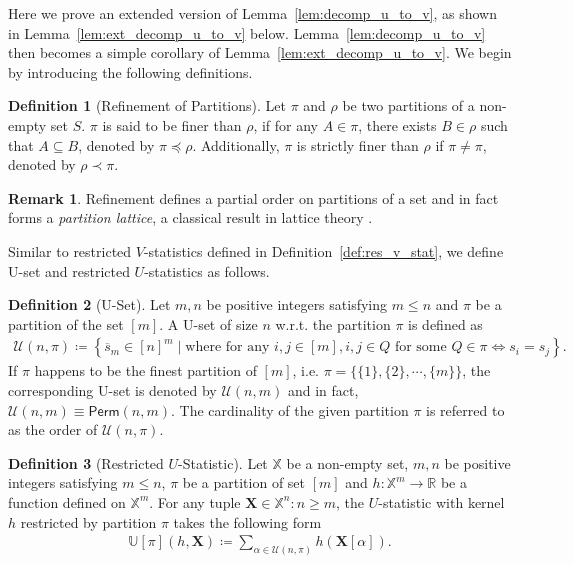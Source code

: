 \documentclass[sn-mathphys, natbib=false]{sn-jnl}
\theoremstyle{plain}
\theoremstyle{definition}
\newtheorem{definition}{Definition}
\newtheorem{remark}{Remark}
\newcommand{\sPi}{\pi}
\newcommand{\uset}{\calU}
\newcommand{\usetnm}[2]{\uset\left(#1,#2\right)}
\newcommand{\ustat}{\mathbb{U}}
\newcommand{\perm}[1]{\mathsf{Perm}(#1)}
\newcommand{\pleq}{\preceq}
\newcommand{\pless}{\prec}
\newcommand{\bbR}{{\mathbb{R}}}
\def\bbX{\mathbb{X}}
\def\calU{\mathcal{U}}
\begin{document}
\begin{bibunit}[agsm]
Here we prove an extended version of Lemma~\ref{lem:decomp_u_to_v}, as shown in Lemma~\ref{lem:ext_decomp_u_to_v} below. Lemma~\ref{lem:decomp_u_to_v} then becomes a simple corollary of Lemma~\ref{lem:ext_decomp_u_to_v}. We begin by introducing the following definitions.

\begin{definition}[Refinement of Partitions]\label{def:refinement_of_partition}
Let $\sPi$ and $\rho$ be two partitions of a non-empty set $S$. $\sPi$ is said to be finer than $\rho$, if for any $A \in \sPi$, there exists $B \in \rho$ such that $A \subseteq B$, denoted by $\sPi \pleq \rho$. Additionally, $\sPi$ is strictly finer than $\rho$ if $\sPi \neq \sPi$, denoted by $\rho \pless \sPi$. 
\end{definition}

\begin{remark}
Refinement defines a partial order on partitions of a set and in fact forms a \emph{partition lattice}, a classical result in lattice theory \citep{birkhoff1940lattice}. 
\end{remark}

Similar to restricted $V$-statistics defined in Definition~\ref{def:res_v_stat}, we define U-set and restricted $U$-statistics as follows. 

\begin{definition}[U-Set]\label{def:u_set}
Let $m,n$ be positive integers satisfying $m \leq n$ and $\sPi$ be a partition of the set $[m]$. A U-set of size $n$ w.r.t. the partition $\sPi$ is defined as
    \begin{align*}
        \usetnm{n}{\sPi} \coloneqq \left\{ \overline{s}_m \in [n]^m \mid \text{where for any $i, j \in [m]$}, i, j \in Q \text{ for some $Q \in \sPi$} \iff   s_i = s_j \right\}.
    \end{align*}
    If $\sPi$ happens to be the finest partition of $[m]$, i.e. $\sPi = \{\{1\}, \{2\}, \cdots, \{m\}\}$, the corresponding U-set is denoted by $\uset(n,m)$ and in fact, $\uset(n,m) \equiv \perm{n,m}$. The cardinality of the given partition $\sPi$ is referred to as the order of $\usetnm{n}{\sPi}$.
\end{definition}

\begin{definition}[Restricted $U$-Statistic]\label{def:res_u_stats}
    Let $\bbX$ be a non-empty set, $m, n$ be positive integers satisfying $m \leq n$, $\sPi$ be a partition of set $[m]$ and $h: \bbX^{m} \rightarrow \bbR$ be a function defined on $\bbX^m$. For any tuple $\bm{X} \in \bbX^n: n \geq m$, the $U$-statistic with kernel $h$ restricted by partition $\sPi$ takes the following form 
    \begin{align*}
        \ustat[\pi](h, \bm{X}) \coloneqq \sum_{\alpha \in \uset(n,\pi)} h(\bm{X}[\alpha]). 
    \end{align*}
\end{definition}


\end{bibunit}
\end{document}
